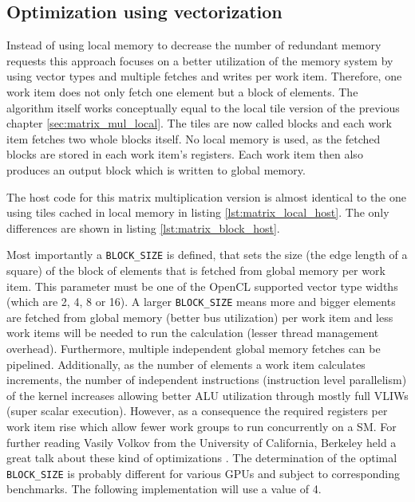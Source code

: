 \subsection{Optimization using vectorization}
\label{sec:matrix_mul_vec}
Instead of using local memory to decrease the number of redundant memory requests this approach focuses on a better utilization of the memory system by using vector types and multiple fetches and writes per work item. Therefore, one work item does not only fetch one element but a block of elements.
The algorithm itself works conceptually equal to the local tile version of the previous chapter \ref{sec:matrix_mul_local}. The tiles are now called blocks and each work item fetches two whole blocks itself. No local memory is used, as the fetched blocks are stored in each work item's registers. Each work item then also produces an output block which is written to global memory.

The host code for this matrix multiplication version is almost identical to the one using tiles cached in local memory in listing \ref{lst:matrix_local_host}. The only differences are shown in listing \ref{lst:matrix_block_host}.



Most importantly a \lstinline!BLOCK_SIZE! is defined, that sets the size (the edge length of a square) of the block of elements that is fetched from global memory per work item. This parameter must be one of the OpenCL supported vector type widths (which are 2, 4, 8 or 16). A larger \lstinline!BLOCK_SIZE! means more and bigger elements are fetched from global memory (better bus utilization) per work item and less work items will be needed to run the calculation (lesser thread management overhead). Furthermore, multiple independent global memory fetches can be pipelined. Additionally, as the number of elements a work item calculates increments, the number of independent instructions (instruction level parallelism) of the kernel increases allowing better ALU utilization through mostly full VLIWs (super scalar execution). However, as a consequence the required registers per work item rise which allow fewer work groups to run concurrently on a SM. For further reading Vasily Volkov from the University of California, Berkeley held a great talk about these kind of optimizations \cite{volkov}.
The determination of the optimal \lstinline!BLOCK_SIZE! is probably different for various GPUs and subject to corresponding benchmarks. The following implementation will use a value of 4.
 
